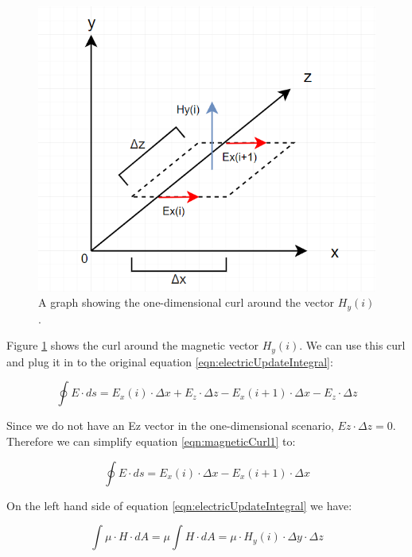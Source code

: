 \begin{figure}
	\centering
	\includegraphics[scale=0.7]{Figures/fdtd1dHcurl}
	\decoRule
	\caption[1D Curl around $H_y$]{A graph showing the one-dimensional curl around the vector $H_y(i)$.}
	\label{fig:fdtd1dHcurl}
\end{figure}

Figure \ref{fig:fdtd1dHcurl} shows the curl around the magnetic vector $H_y(i)$. We can use this curl and plug it in to the original equation \ref{eqn:electricUpdateIntegral}:

\begin{equation}
	\label{eqn:magneticCurl1}
	\oint E \cdot ds = E_x(i) \cdot \Delta x + E_z \cdot \Delta z - E_x(i+1) \cdot \Delta x - E_z \cdot \Delta z
\end{equation}

Since we do not have an Ez vector in the one-dimensional scenario, $Ez \cdot \Delta z = 0$. Therefore we can simplify equation \ref{eqn:magneticCurl1} to:

\begin{equation}
	\label{eqn:magneticCurl2}
	\oint E \cdot ds = E_x(i) \cdot \Delta x - E_x(i+1) \cdot \Delta x
\end{equation}

On the left hand side of equation \ref{eqn:electricUpdateIntegral} we have:

\begin{equation}
	\label{eqn:magneticCurl3}
	\int \mu \cdot H \cdot dA = \mu \int H \cdot dA = \mu \cdot H_y(i) \cdot \Delta y \cdot \Delta z
\end{equation}

